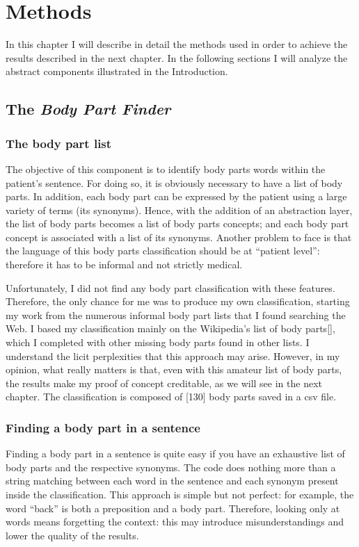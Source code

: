 \chapter{Methods}
\label{cha:methods}
In this chapter I will describe in detail the methods used in order to achieve the results described in the next chapter. In the following sections I will analyze the abstract components illustrated in the Introduction.

\section{The \textit{Body Part Finder}}
\label{sec:body_part_finder}
\subsection{The body part list}
The objective of this component is to identify body parts words within the patient's sentence. For doing so, it is obviously necessary to have a list of body parts. In addition, each body part can be expressed by the patient using a large variety of terms (its synonyms). Hence, with the addition of an abstraction layer, the list of body parts becomes a list of body parts concepts; and each body part concept is associated with a list of its synonyms. Another problem to face is that the language of this body parts classification should be at “patient level”: therefore it has to be informal and not strictly medical.

Unfortunately, I did not find any body part classification with these features. Therefore, the only chance for me was to produce my own classification, starting my work from the numerous informal body part lists that I found searching the Web. I based my classification mainly on the Wikipedia's list of body parts[], which I completed with other missing body parts found in other lists. I understand the licit perplexities that this approach may arise. However, in my opinion, what really matters is that, even with this amateur list of body parts, the results make my proof of concept creditable, as we will see in the next chapter. The classification is composed of [130] body parts saved in a csv file.

\subsection{Finding a body part in a sentence}
Finding a body part in a sentence is quite easy if you have an exhaustive list of body parts and the respective synonyms. The code does nothing more than a string matching between each word in the sentence and each synonym present inside the classification. This approach is simple but not perfect: for example, the word “back” is both a preposition and a body part. Therefore, looking only at words means forgetting the context: this may introduce misunderstandings and lower the quality of the results.

